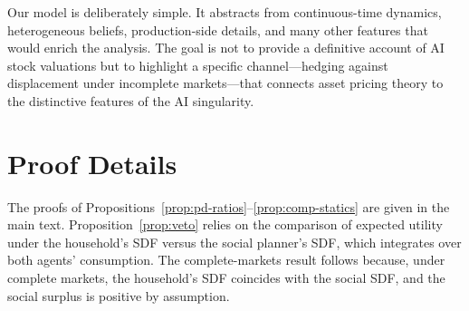 \documentclass[12pt]{article}
\begin{document}
Our model is deliberately simple. It abstracts from continuous-time dynamics, heterogeneous beliefs, production-side details, and many other features that would enrich the analysis. The goal is not to provide a definitive account of AI stock valuations but to highlight a specific channel---hedging against displacement under incomplete markets---that connects asset pricing theory to the distinctive features of the AI singularity.

\printbibliography

\appendix
\section{Proof Details} %

The proofs of Propositions~\ref{prop:pd-ratios}--\ref{prop:comp-statics} are given in the main text. Proposition~\ref{prop:veto} relies on the comparison of expected utility under the household's SDF versus the social planner's SDF, which integrates over both agents' consumption. The complete-markets result follows because, under complete markets, the household's SDF coincides with the social SDF, and the social surplus is positive by assumption.
\end{document}

